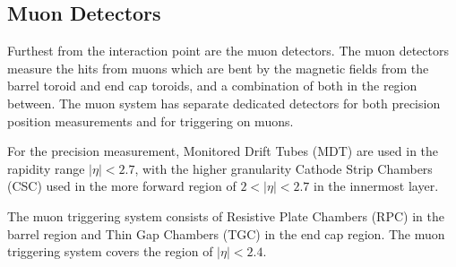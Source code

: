 \subsection{Muon Detectors}

Furthest from the interaction point are the muon detectors. 
The muon detectors measure the hits from muons which are bent by the magnetic fields from the barrel toroid  and end cap toroids, and a combination of both in the region between. 
The muon system has separate dedicated detectors for both precision position measurements and for triggering on muons.

For the precision measurement, Monitored Drift Tubes (MDT) are used in the rapidity range $|\eta|<2.7$, with the higher granularity Cathode Strip Chambers (CSC) used in the more forward region of $2<|\eta|<2.7$ in the innermost layer. 

The muon triggering system consists of Resistive Plate Chambers (RPC) in the barrel region and Thin Gap Chambers (TGC) in the end cap region. 
The muon triggering system covers the region of $|\eta|<2.4$. 


